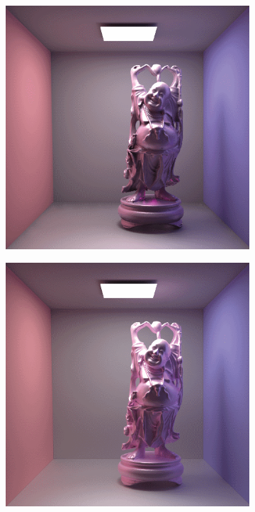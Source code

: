 \begin{figure}[htb]
\begin{subfigure}[b]{0.32\textwidth}
        \includegraphics[width=1.0\linewidth]{graphics/clamping2-dachsbacher}%
        \caption{}
    \end{subfigure}%
    \hfill
    \begin{subfigure}[b]{0.32\textwidth}
        \centering
        \includegraphics[width=1.0\linewidth]{graphics/clamping3-dachsbacher}%

\end{subfigure}
\end{figure}
